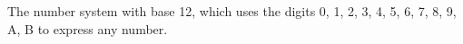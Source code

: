  The number system with base 12, which
uses the digits 0, 1, 2, 3, 4, 5, 6, 7, 8, 9, A, B
to express any number.
